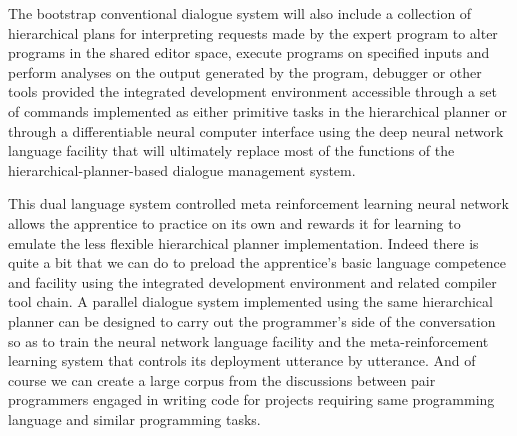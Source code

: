The bootstrap conventional dialogue system will also include a collection of hierarchical plans for interpreting requests made by the expert program to alter programs in the shared editor space, execute programs on specified inputs and perform analyses on the output generated by the program, debugger or other tools provided the integrated development environment accessible through a set of commands implemented as either primitive tasks in the hierarchical planner or through a differentiable neural computer interface using the deep neural network language facility that will ultimately replace most of the functions of the hierarchical-planner-based dialogue management system.

This dual language system controlled meta reinforcement learning neural network allows the apprentice to practice on its own and rewards it for learning to emulate the less flexible hierarchical planner implementation. Indeed there is quite a bit that we can do to preload the apprentice’s basic language competence and facility using the integrated development environment and related compiler tool chain. A parallel dialogue system implemented using the same hierarchical planner can be designed to carry out the programmer’s side of the conversation so as to train the neural network language facility and the meta-reinforcement learning system that controls its deployment utterance by utterance. And of course we can create a large corpus from the discussions between pair programmers engaged in writing code for projects requiring same programming language and similar programming tasks.

